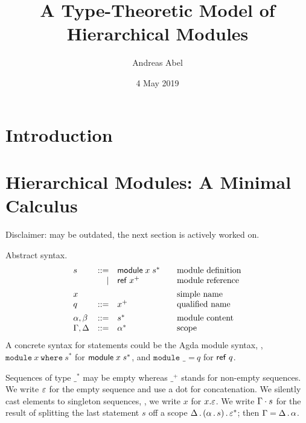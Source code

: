 \documentclass{article}
\title{A Type-Theoretic Model of Hierarchical Modules}
\author{Andreas Abel}
\date{4 May 2019}
\theoremstyle{definition}
\theoremstyle{plain}
\theoremstyle{remark}
\begin{document}
\maketitle

\begin{abstract}
\end{abstract}

\section{Introduction}
\label{sec:intro}

\section{Hierarchical Modules: A Minimal Calculus}

Disclaimer: may be outdated, the next section is actively worked on.

Abstract syntax.
\[
\begin{array}{lrl@{\qquad}l}
  s & ::=  & \mdef x {s^*}    & \mbox{module definition} \\
    & \mid & \mref {x^+}      & \mbox{module reference}  \\[1ex]
  x &  &                      & \mbox{simple name}       \\
  q & ::=  & x^+              & \mbox{qualified name}    \\[1ex]
  \alpha,\beta  & ::= & s^*   & \mbox{module content}    \\
  \Gamma,\Delta & ::= & \Ga^* & \mbox{scope}             \\
\end{array}
\]
A concrete syntax for statements could be the Agda module syntax, \ie,
$\texttt{module}~x~\texttt{where}~s^*$ for $\mathsf{module}\;x\;s^*$, and
$\texttt{module~\_~=}~q$ for $\mathsf{ref}\;q$.

Sequences of type $\_^*$ may be empty whereas $\_^+$ stands for
non-empty sequences.
We write $\varepsilon$ for the empty sequence and use a dot %
for concatenation.
We silently cast elements to singleton sequences, \eg,
we write $x$ for $x.\varepsilon$.
We write $\Gamma \cdot s$ for the result of splitting the last
statement $s$ off a scope $\Delta \,.\, (\alpha \,.\, s) \,.\, \varepsilon^*$;
then $\Gamma = \Delta \,.\, \alpha$.
\end{document}
